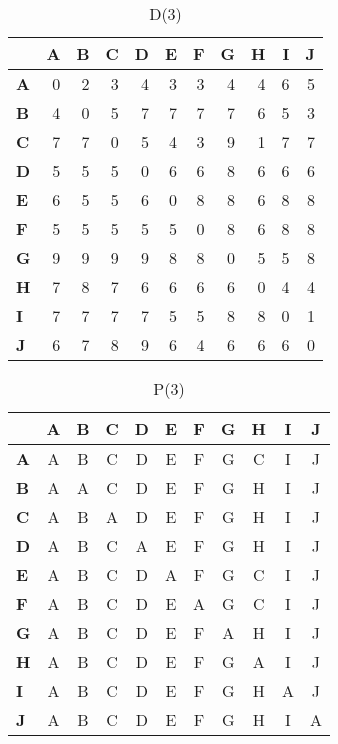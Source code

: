 \documentclass{article}
\begin{document}
\begin{table}[H]\centering
\caption{D(3)}
\begin{tabular}{l r r r r r r r r r r}
\toprule
 & \textbf{A} & \textbf{B} & \textbf{C} & \textbf{D} & \textbf{E} & \textbf{F} & \textbf{G} & \textbf{H} & \textbf{I} & \textbf{J}\\\midrule
\textbf{A} & 0 & 2 & 3 & 4 & 3 & 3 & 4 & \cellcolor{yellow!30}4 & 6 & 5 \\
\textbf{B} & 4 & 0 & 5 & 7 & 7 & 7 & 7 & 6 & 5 & 3 \\
\textbf{C} & 7 & 7 & 0 & 5 & 4 & 3 & 9 & 1 & 7 & 7 \\
\textbf{D} & 5 & 5 & 5 & 0 & 6 & 6 & 8 & 6 & 6 & 6 \\
\textbf{E} & 6 & 5 & 5 & 6 & 0 & 8 & 8 & \cellcolor{yellow!30}6 & 8 & 8 \\
\textbf{F} & 5 & 5 & 5 & 5 & 5 & 0 & 8 & \cellcolor{yellow!30}6 & 8 & 8 \\
\textbf{G} & 9 & 9 & 9 & 9 & 8 & 8 & 0 & 5 & 5 & 8 \\
\textbf{H} & 7 & 8 & 7 & 6 & 6 & 6 & 6 & 0 & 4 & 4 \\
\textbf{I} & 7 & 7 & 7 & 7 & 5 & 5 & 8 & 8 & 0 & 1 \\
\textbf{J} & 6 & 7 & 8 & 9 & 6 & 4 & 6 & 6 & 6 & 0 \\
\bottomrule
\end{tabular}
\end{table}

\begin{table}[H]\centering
\caption{P(3)}
\begin{tabular}{l c c c c c c c c c c}
\toprule
 & \textbf{A} & \textbf{B} & \textbf{C} & \textbf{D} & \textbf{E} & \textbf{F} & \textbf{G} & \textbf{H} & \textbf{I} & \textbf{J}\\\midrule
\textbf{A} & A & B & C & D & E & F & G & \cellcolor{yellow!30}C & I & J \\
\textbf{B} & A & A & C & D & E & F & G & H & I & J \\
\textbf{C} & A & B & A & D & E & F & G & H & I & J \\
\textbf{D} & A & B & C & A & E & F & G & H & I & J \\
\textbf{E} & A & B & C & D & A & F & G & \cellcolor{yellow!30}C & I & J \\
\textbf{F} & A & B & C & D & E & A & G & \cellcolor{yellow!30}C & I & J \\
\textbf{G} & A & B & C & D & E & F & A & H & I & J \\
\textbf{H} & A & B & C & D & E & F & G & A & I & J \\
\textbf{I} & A & B & C & D & E & F & G & H & A & J \\
\textbf{J} & A & B & C & D & E & F & G & H & I & A \\
\bottomrule
\end{tabular}
\end{table}
\end{document}
